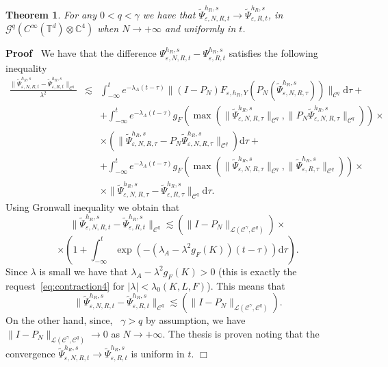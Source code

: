 \documentclass{article}
\newcommand{\mathd}{\mathrm{d}}
\newenvironment{proof}{\noindent\textbf{Proof\ }}{\hspace*{\fill}$\Box$\medskip}
\newtheorem{theorem}{Theorem}
\begin{document}
\begin{theorem}
  \label{theorem_convergence1}For any $0 < q < \gamma$ we have that
  $\tilde{\Psi}_{\varepsilon, N, R, t}^{h_R, s} \rightarrow
  \tilde{\Psi}_{\varepsilon, R, t}^{h_R, s}$, in $\mathcal{G}^q (C^{\infty}
  (\mathbb{T}^d) \otimes \mathbb{C}^4)$ when $N \rightarrow + \infty$ and
  uniformly in $t$.
\end{theorem}

\begin{proof}
  We have that the difference $\Psi_{\varepsilon, N, R, t}^{h_R, s} -
  \Psi_{\varepsilon, R, t}^{h_R, s} $ satisfies the following inequality
  \begin{eqnarray}
    \frac{\| \tilde{\Psi}_{\varepsilon, N, R, t}^{h_R, s} -
    \tilde{\Psi}_{\varepsilon, R, t}^{h_R, s} \|_{\mathcal{C}^q}}{\lambda^2} &
    \lesssim & \int_{- \infty}^t e^{- \lambda_A (t - \tau)} \| (I - P_N)
    F_{\varepsilon, h_R, Y} (P_N (\tilde{\Psi}_{\varepsilon, N, R, \tau}^{h_R,
    s})) \|_{\mathcal{C}^q} \mathd \tau + \nonumber\\
    &  & + \int_{- \infty}^t e^{- \lambda_A (t - \tau)} g_F (\max (\|
    \tilde{\Psi}_{\varepsilon, N, R, \tau}^{h_R, s} \|_{\mathcal{C}^q}, \| P_N
    \tilde{\Psi}_{\varepsilon, N, R, \tau}^{h_R, s} \|_{\mathcal{C}^q}))
    \times \nonumber\\
    &  & \times (\| \tilde{\Psi}_{\varepsilon, N, R, \tau}^{h_R, s} - P_N
    \tilde{\Psi}_{\varepsilon, N, R, \tau}^{h_R, s} \|_{\mathcal{C}^q}) \mathd
    \tau + \nonumber\\
    &  & + \int_{- \infty}^t e^{- \lambda_A (t - \tau)} g_F (\max (\|
    \tilde{\Psi}_{\varepsilon, N, R, \tau}^{h_R, s} \|_{\mathcal{C}^q}, \|
    \tilde{\Psi}_{\varepsilon, R, \tau}^{h_R, s} \|_{\mathcal{C}^q})) \times
    \nonumber\\
    &  & \times \| \tilde{\Psi}_{\varepsilon, N, R, \tau}^{h_R, s} -
    \tilde{\Psi}_{\varepsilon, R, \tau}^{h_R, s} \|_{\mathcal{C}^q} \mathd
    \tau . \nonumber
  \end{eqnarray}
  Using Gronwall inequality we obtain that
  \[ \| \tilde{\Psi}_{\varepsilon, N, R, t}^{h_R, s} -
     \tilde{\Psi}_{\varepsilon, R, t}^{h_R, s} \|_{\mathcal{C}^q} \lesssim (\|
     I - P_N \|_{\mathcal{L} (\mathcal{C}^{\gamma}, \mathcal{C}^q)}) \times \]
  \[ \times \left( 1 + \int_{- \infty}^t \exp (- (\lambda_A - \lambda^2 g_F
     (K)) (t - \tau)) \mathd \tau \right) . \]
  Since $\lambda$ is small we have that $\lambda_A - \lambda^2 g_F (K) > 0$
  (this is exactly the request~{\eqref{eq:contraction4}} for $| \lambda | <
  \lambda_0 (K, L, F)$). This means that
  \[ \| \tilde{\Psi}_{\varepsilon, N, R, t}^{h_R, s} -
     \tilde{\Psi}_{\varepsilon, R, t}^{h_R, s} \|_{\mathcal{C}^q} \lesssim (\|
     I - P_N \|_{\mathcal{L} (\mathcal{C}^{\gamma}, \mathcal{C}^q)}) . \]
  On the other hand, since, \ $\gamma > q$ by assumption, we have $\| I - P_N
  \|_{\mathcal{L} (\mathcal{C}^{\gamma}, \mathcal{C}^q)} \rightarrow 0$ as $N
  \rightarrow + \infty$. The thesis is proven noting that the convergence
  $\tilde{\Psi}_{\varepsilon, N, R, t}^{h_R, s} \rightarrow
  \tilde{\Psi}_{\varepsilon, R, t}^{h_R, s}$ is uniform in $t$.
\end{proof}
\end{document}
